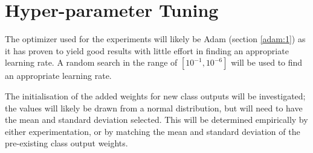 \documentclass{report}
\begin{document}
	\section{Hyper-parameter Tuning}
	The optimizer used for the experiments will likely be Adam (section \ref{adam:1}) as it has proven to yield good results with little effort in finding an appropriate learning rate. A random search in the range of $[10^{-1}, 10^{-6}]$ will be used to find an appropriate learning rate. \par
	The initialisation of the added weights for new class outputs will be investigated; the values will likely be drawn from a normal distribution, but will need to have the mean and standard deviation selected. This will be determined empirically by either experimentation, or by matching the mean and standard deviation of the pre-existing class output weights. \par
	
\end{document}
